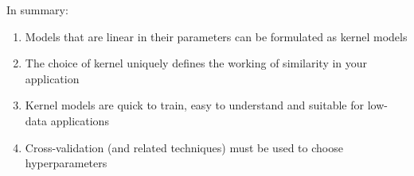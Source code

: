 In summary:
\vspace{1cm}
\pause{}
\begin{enumerate}
	\item Models that are linear in their parameters can be formulated as kernel models\pause{}
	\item The choice of kernel uniquely defines the working of similarity in your application\pause{}
	\item Kernel models are quick to train, easy to understand and suitable for low-data applications\pause{}
	\item Cross-validation (and related techniques)  must be used to choose hyperparameters\pause{}
\end{enumerate}
